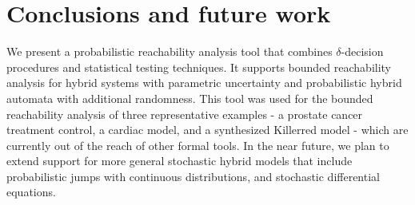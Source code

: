 \section{Conclusions and future work}
We present a probabilistic reachability analysis tool that combines $\delta$-decision 
procedures and statistical testing techniques. 
It supports bounded reachability analysis for hybrid systems with parametric 
uncertainty and probabilistic hybrid automata with additional randomness. This tool was used for the bounded reachability analysis of three representative examples - a prostate 
cancer treatment control, a cardiac model, and a synthesized Killerred model - which are currently out of the reach of other formal tools. In the near future, we plan to extend support for more general stochastic hybrid models 
that include probabilistic jumps with continuous distributions, and stochastic differential equations.
